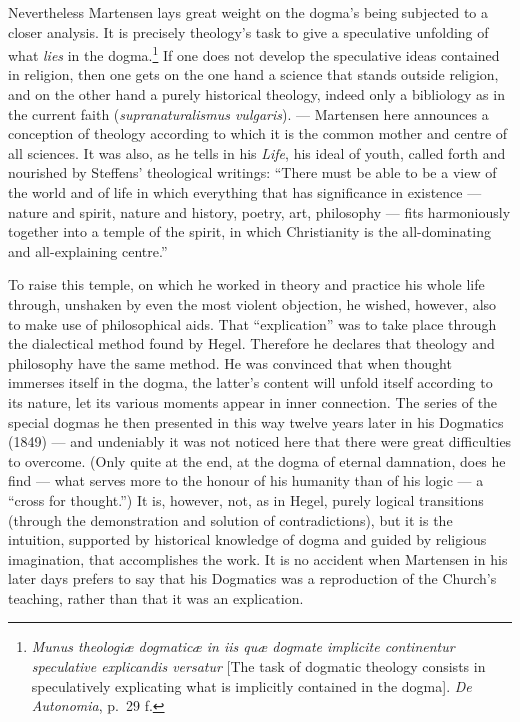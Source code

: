 \documentclass[12pt,a4paper]{book}
\newcommand{\opage}[1]{\marginnote{\footnotesize\textit{[#1]}}}
\begin{document}
Nevertheless Martensen lays great weight on the dogma's being subjected to a closer analysis. It
is precisely theology's task to give a speculative unfolding of what \emph{lies} in the
dogma.\footnote{\emph{Munus theologiæ dogmaticæ in iis quæ dogmate implicite continentur
speculative explicandis versatur} [The task of dogmatic theology consists in speculatively
explicating what is implicitly contained in the dogma]. \emph{De Autonomia}, p.~29 f.} If one does
not develop the speculative ideas contained in religion, then one gets on the one hand a science
that stands outside religion, and on the other hand a purely historical theology, indeed only a
bibliology as in the current faith (\emph{supranaturalismus vulgaris}). --- Martensen here
announces a conception of theology according to which it is the common mother and centre of all
sciences. It was also, as he tells in his \emph{Life}, his ideal of youth, called forth and
nourished by Steffens' theological writings: ``There must be able to be a view of the world and of
life in which everything that has significance in existence --- nature and spirit, nature and
history, poetry, art, philosophy --- fits harmoniously together into a temple of the spirit, in
which Christianity is the all-dominating and all-explaining centre.''

To raise this temple, on which he worked in theory and practice his whole life through, unshaken
by even the most violent objection, he wished, however, also to make use of philosophical aids.
That ``explication'' was to take place through the dialectical method found by Hegel. Therefore he
declares that theology and philosophy have the same method. He was convinced that when thought
immerses itself in the dogma, the latter's content will unfold itself according to its nature, let
its various moments appear in inner connection. The series of the special dogmas he then presented
in this way twelve years later in his Dogmatics (1849) --- and undeniably it was not noticed here
that there were great difficulties to overcome. (\opage{140}Only quite at the end, at the dogma of eternal
damnation, does he find --- what serves more to the honour of his humanity than of his logic --- a
``cross for thought.'') It is, however, not, as in Hegel, purely logical transitions (through the
demonstration and solution of contradictions), but it is the intuition, supported by historical
knowledge of dogma and guided by religious imagination, that accomplishes the work. It is no
accident when Martensen in his later days prefers to say that his Dogmatics was a reproduction of
the Church's teaching, rather than that it was an explication.
\end{document}
